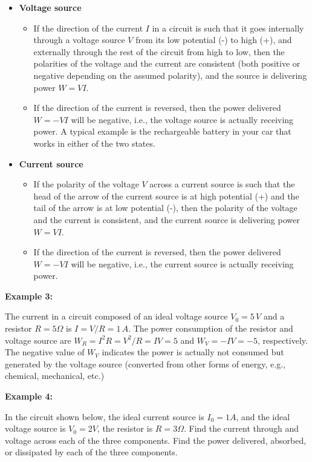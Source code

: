 \documentclass{article}
\begin{document}
\begin{itemize}
\item {\bf Voltage source}
  \begin{itemize}
  \item If the direction of the current $I$ in a circuit is such that it 
    goes internally through a voltage source $V$ from its low potential 
    (-) to high (+), and externally through the rest of the circuit from
    high to low, then the polarities of the voltage and the current are
    consistent (both positive or negative depending on the assumed 
    polarity), and the source is delivering power $W=VI$.
  \item If the direction of the current is reversed, then the power 
    delivered $W=-VI$ will be negative, i.e., the voltage source is actually 
    receiving power. A typical example is the rechargeable battery in your 
    car that works in either of the two states.
  \end{itemize}
\item {\bf Current source}
  \begin{itemize}
  \item If the polarity of the voltage $V$ across a current 
    source is such that the head of the arrow of the current source is
    at high potential (+) and the tail of the arrow is at low potential (-),
    then the polarity of the voltage and the current is consistent, and 
    the current source is delivering power $W=VI$.
  \item If the direction of the current is reversed, then the power 
    delivered $W=-VI$ will be negative, i.e., the current source is actually 
    receiving power. 
  \end{itemize}
\end{itemize}

{\bf Example 3:}

The current in a circuit composed of an ideal voltage source $V_0=5\,V$ 
and a resistor $R=5\Omega$ is $I=V/R=1\,A$. The power consumption of the
resistor and voltage source are $W_R=I^2R=V^2/R=IV=5$ and $W_V=-IV=-5$,
respectively. The negative value of $W_V$ indicates the power is actually
not consumed but generated by the voltage source (converted from other 
forms of energy, e.g., chemical, mechanical, etc.)

{\bf Example 4:} 
    
In the circuit shown below, the ideal current source is $I_0=1A$, and the 
ideal voltage source is $V_0=2V$, the resistor is $R=3\Omega$. Find the
current through and voltage across each of the three components. Find the 
power delivered, absorbed, or dissipated by each of the three components.
\end{document}
